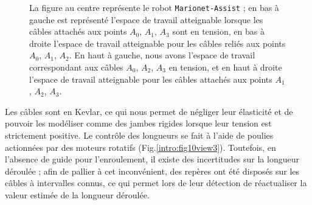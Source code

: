\begin{figure}[!ht]
\centering
\def\svgwidth{.90\linewidth}

\caption{\footnotesize{La figure au centre représente le robot {\tt Marionet-Assist} ; en bas à gauche est représenté l'espace de travail atteignable lorsque les câbles attachés aux points $A_0$, $A_1$, $A_3$ sont en tension, en bas à droite l'espace de travail atteignable pour les câbles reliés aux points $A_0$, $A_1$, $A_2$. En haut à gauche, nous avons l'espace de travail correspondant aux câbles $A_0$, $A_2$, $A_3$ en tension, et en haut à droite l'espace de travail atteignable pour les câbles attachés aux points $A_1$, $A_2$, $A_3$.}}
\label{intro:fig11}
\end{figure}

Les câbles sont en Kevlar, ce qui nous permet de négliger leur élasticité et de pouvoir les modéliser comme des jambes rigides lorsque leur tension est strictement positive. Le contrôle des longueurs se fait à l'aide de poulies actionnées par des moteurs rotatifs (Fig.\ref{intro:fig10view3}). Toutefois, en l'absence de guide pour l'enroulement, il existe des incertitudes sur la longueur déroulée ; afin de pallier à cet inconvénient, des repères ont été disposés sur les câbles à intervalles connus, ce qui permet lors de leur détection de réactualiser la valeur estimée de la longueur déroulée.

